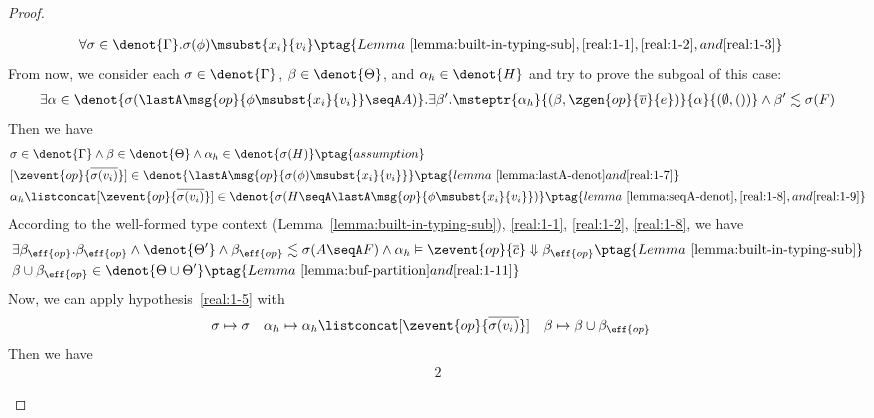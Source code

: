 \begin{proof}
\begin{enumerate}[label=Case]
{\begin{alignat}{2}
&\forall \sigma \in \denot{\Gamma}. \sigma(\phi)\msubst{x_i}{v_i} \ptag{Lemma~\ref{lemma:built-in-typing-sub}, \ref{real:1-1}, \ref{real:1-2}, and \ref{real:1-3}} \label{real:1-7}
\end{alignat}}\noindent
From now, we consider each $\sigma \in \denot{\Gamma}$, $\beta \in \denot{\Theta}$, and $\alpha_h \in \denot{H}$ and try to prove the subgoal of this case: 
{\footnotesize\begin{align*}
    \exists \alpha \in\denot{\sigma(\lastA\msg{op}{\phi\msubst{x_i}{v_i}} \seqA A)}. \exists \beta'. \msteptr{\alpha_h}{(\beta, \zgen{op}{\overline{v}}{e})}{\alpha}{(\emptyset, ())} \land \beta' \realz \sigma(F)
\end{align*}}\noindent
Then we have
{\footnotesize\begin{alignat}{2}
&\sigma \in \denot{\Gamma} \land \beta \in \denot{\Theta} \land \alpha_h \in \denot{\sigma(H)} \ptag{assumption} \label{real:1-8}
\\& [\zevent{op}{\overline{\sigma(v_i)}}] \in \denot{\lastA\msg{op}{\sigma(\phi)\msubst{x_i}{v_i}}} \ptag{lemma~\ref{lemma:lastA-denot} and \ref{real:1-7}} \label{real:1-9}
\\& \alpha_h \listconcat [\zevent{op}{\overline{\sigma(v_i)}}] \in \denot{\sigma(H \seqA \lastA\msg{op}{\phi\msubst{x_i}{v_i}})} \ptag{lemma~\ref{lemma:seqA-denot}, \ref{real:1-8}, and \ref{real:1-9}} \label{real:1-10}
\end{alignat}}\noindent
According to the well-formed type context (Lemma~\ref{lemma:built-in-typing-sub}), \ref{real:1-1}, \ref{real:1-2}, \ref{real:1-8}, we have
{\footnotesize\begin{alignat}{2}
& \exists \beta_{\eff{op}}. \beta_{\eff{op}} \land \denot{\Theta'} \land \beta_{\eff{op}} \realz \sigma(A\seqA F) \land \alpha_h \vDash \zevent{op}{\overline{c}} \Downarrow \beta_{\eff{op}} \ptag{Lemma~\ref{lemma:built-in-typing-sub}} \label{real:1-11}
\\& \beta \cup \beta_{\eff{op}} \in  \denot{ \Theta \cup \Theta'} \ptag{Lemma~\ref{lemma:buf-partition} and \ref{real:1-11}} \label{real:1-12}
\end{alignat}}\noindent
Now, we can apply hypothesis~\ref{real:1-5} with
{\footnotesize\begin{align*}
    &\sigma \mapsto \sigma \quad \alpha_h \mapsto \alpha_h \listconcat [\zevent{op}{\overline{\sigma(v_i)}}] \quad \beta \mapsto \beta \cup \beta_{\eff{op}}
\end{align*}}\noindent
Then we have
{\footnotesize\begin{alignat}{2}

\end{alignat}}
\end{enumerate}
\end{proof}
